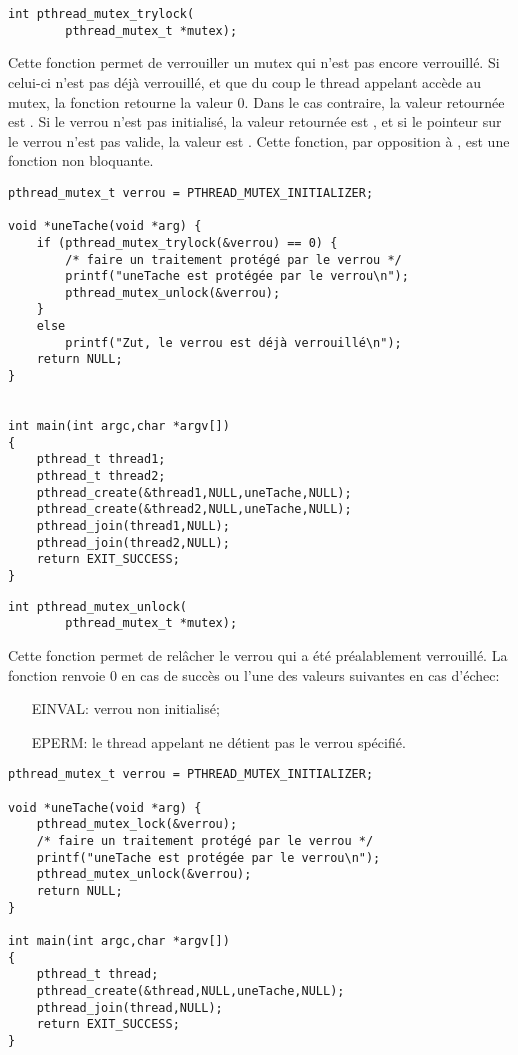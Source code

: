 \label{func:pthread_mutex_trylock}

\begin{lstlisting}
int pthread_mutex_trylock(
		pthread_mutex_t *mutex);
\end{lstlisting}

Cette fonction permet de verrouiller un mutex qui n'est pas encore verrouillé. Si celui-ci n'est pas déjà verrouillé, et que du coup le thread appelant accède au mutex, la fonction retourne la valeur 0. Dans le cas contraire, la valeur retournée est . Si le verrou n'est pas initialisé, la valeur retournée est , et si le pointeur sur le verrou n'est pas valide, la valeur est . Cette fonction, par opposition à , est une fonction non bloquante.

\begin{lstlisting}[frame=trBL]
pthread_mutex_t verrou = PTHREAD_MUTEX_INITIALIZER;

void *uneTache(void *arg) {
	if (pthread_mutex_trylock(&verrou) == 0) {
		/* faire un traitement protégé par le verrou */
		printf("uneTache est protégée par le verrou\n");
		pthread_mutex_unlock(&verrou);
	}
	else
		printf("Zut, le verrou est déjà verrouillé\n");
	return NULL;
}


int main(int argc,char *argv[])
{
	pthread_t thread1;
	pthread_t thread2;
	pthread_create(&thread1,NULL,uneTache,NULL);
	pthread_create(&thread2,NULL,uneTache,NULL);
	pthread_join(thread1,NULL);
	pthread_join(thread2,NULL);
	return EXIT_SUCCESS;
}
\end{lstlisting}


\label{func:pthread_mutex_unlock}

\begin{lstlisting}
int pthread_mutex_unlock(
		pthread_mutex_t *mutex);
\end{lstlisting}

Cette fonction permet de relâcher le verrou qui a été préalablement verrouillé. La fonction renvoie 0 en cas de succès ou l'une des valeurs suivantes en cas d'échec:
\begin{itemize}
\item[EINVAL:] verrou non initialisé;
\item[EPERM:] le thread appelant ne détient pas le verrou spécifié.
\end{itemize}

\begin{lstlisting}[frame=trBL]
pthread_mutex_t verrou = PTHREAD_MUTEX_INITIALIZER;

void *uneTache(void *arg) {
	pthread_mutex_lock(&verrou);
	/* faire un traitement protégé par le verrou */
	printf("uneTache est protégée par le verrou\n");
	pthread_mutex_unlock(&verrou);
	return NULL;
}

int main(int argc,char *argv[])
{
	pthread_t thread;
	pthread_create(&thread,NULL,uneTache,NULL);
	pthread_join(thread,NULL);
	return EXIT_SUCCESS;
}
\end{lstlisting}

